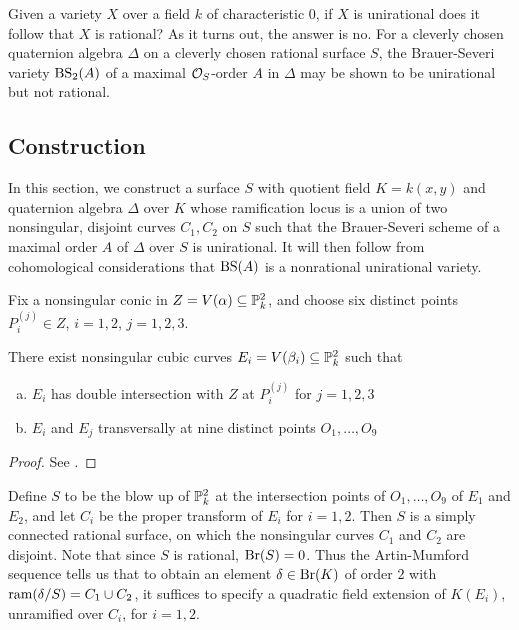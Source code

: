 Given a variety $X$ over a field $k$ of characteristic $0$, if $X$ is unirational does it follow that $X$ is rational?  As it turns out, the answer is no.  For a cleverly chosen quaternion algebra $\Delta$ on a cleverly chosen rational surface $S$, the Brauer-Severi variety $\textnormal{BS}_2(A)$ of a maximal $\mathcal{O}_S$-order $A$ in $\Delta$ may be shown to be unirational but not rational.

\subsection{Construction}
In this section, we construct a surface $S$ with quotient field $K = k(x,y)$ and quaternion algebra $\Delta$ over $K$ whose ramification locus is a union of two nonsingular, disjoint curves $C_1,C_2$ on $S$ such that the Brauer-Severi scheme of a maximal order $A$ of $\Delta$ over $S$ is unirational.  It will then follow from cohomological considerations that $\textnormal{BS}(A)$ is a nonrational unirational variety.

Fix a nonsingular conic in $Z = V(\alpha)\subseteq \mathbb{P}^2_k$, and choose six distinct points $P_i^{(j)}\in Z$, $i=1,2$, $j=1,2,3$.
\begin{lem}
There exist nonsingular cubic curves $E_i = V(\beta_i) \subseteq \mathbb{P}^2_k$ such that
\begin{enumerate}[(a)]
\item  $E_i$ has double intersection with $Z$ at $P_i^{(j)}$ for $j=1,2,3$
\item  $E_i$ and $E_j$ transversally at nine distinct points $O_1,\dots,O_9$
\end{enumerate}
\end{lem}
\begin{proof}
See \cite{artin1972some}.
\end{proof}

Define $S$ to be the blow up of $\mathbb{P}_k^2$ at the intersection points of $O_1,\dots,O_9$ of $E_1$ and $E_2$, and let $C_i$ be the proper transform of $E_i$ for $i=1,2$.  Then $S$ is a simply connected rational surface, on which the nonsingular curves $C_1$ and $C_2$ are disjoint.  Note that since $S$ is rational, $\textnormal{Br}(S) = 0$.  Thus the Artin-Mumford sequence tells us that to obtain an element $\delta\in\textnormal{Br}(K)$ of order $2$ with $\textnormal{ram}(\delta/S)=C_1\cup C_2$, it suffices to specify a quadratic field extension of $K(E_i)$,  unramified over $C_i$, for $i=1,2$.

